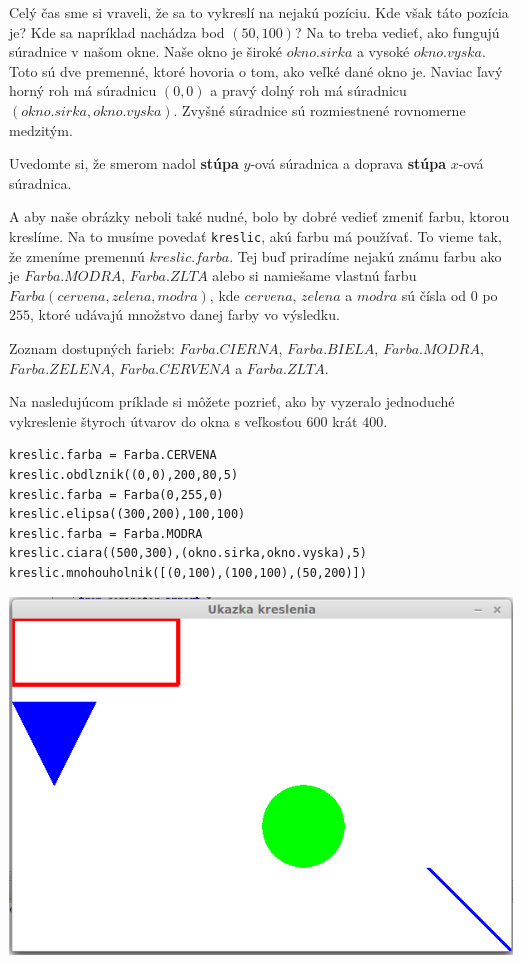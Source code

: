
Celý čas sme si vraveli, že sa to vykreslí na nejakú pozíciu. Kde však táto pozícia je? Kde sa napríklad nachádza bod $(50,100)$? Na to treba vedieť,
ako fungujú súradnice v našom okne. Naše okno je široké $okno.sirka$ a vysoké $okno.vyska$. Toto sú dve premenné, ktoré hovoria o tom, ako veľké dané
okno je. Naviac ľavý horný roh má súradnicu $(0,0)$ a pravý dolný roh má súradnicu $(okno.sirka,okno.vyska)$. Zvyšné súradnice sú rozmiestnené
rovnomerne medzitým.

Uvedomte si, že smerom nadol \textbf{stúpa} $y$-ová súradnica a doprava \textbf{stúpa} $x$-ová súradnica.


A aby naše obrázky neboli také nudné, bolo by dobré vedieť zmeniť farbu, ktorou kreslíme. Na to musíme povedať \texttt{kreslic}, akú farbu má používať.
To vieme tak, že zmeníme premennú $kreslic.farba$. Tej buď priradíme nejakú známu farbu ako je $Farba.MODRA$, $Farba.ZLTA$ alebo si namiešame vlastnú farbu
$Farba(cervena, zelena, modra)$, kde $cervena$, $zelena$ a $modra$ sú čísla od $0$ po $255$, ktoré udávajú množstvo danej farby vo výsledku.

Zoznam dostupných farieb: $Farba.CIERNA$, $Farba.BIELA$, $Farba.MODRA$, $Farba.ZELENA$, $Farba.CERVENA$ a $Farba.ZLTA$.

\bigskip

Na nasledujúcom príklade si môžete pozrieť, ako by vyzeralo jednoduché vykreslenie štyroch útvarov
do okna s veľkosťou $600$ krát $400$.

\begin{lstlisting}
kreslic.farba = Farba.CERVENA
kreslic.obdlznik((0,0),200,80,5)
kreslic.farba = Farba(0,255,0)
kreslic.elipsa((300,200),100,100)
kreslic.farba = Farba.MODRA
kreslic.ciara((500,300),(okno.sirka,okno.vyska),5)
kreslic.mnohouholnik([(0,100),(100,100),(50,200)])
\end{lstlisting}

\includegraphics[scale = 0.5]{priklad1.png}


